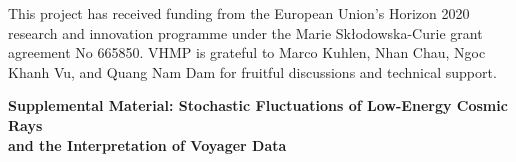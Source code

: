 \documentclass[%
reprint,
amsmath,amssymb,
aps,
superscriptaddress,
preprintnumbers
]{revtex4-2}
\begin{document}
This project has received funding from the European Union’s Horizon 2020 research and innovation programme under the Marie Skłodowska-Curie grant agreement No 665850. VHMP is grateful to Marco Kuhlen, Nhan Chau, Ngoc Khanh Vu, and Quang Nam Dam for fruitful discussions and technical support.   



\newpage

\clearpage
\appendix
\setcounter{equation}{0}
\setcounter{figure}{0}
\widetext
\begin{center}
{\bf \large \large Supplemental Material: Stochastic Fluctuations of Low-Energy Cosmic Rays\\ and the Interpretation of Voyager Data}
\end{center}

\end{document}
